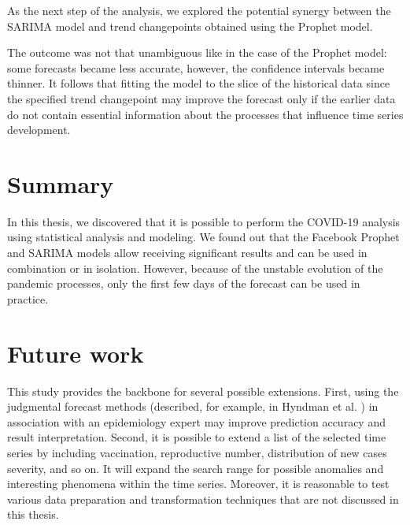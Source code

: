 As the next step of the analysis, we explored the potential synergy between the SARIMA model and trend changepoints obtained using the Prophet model. 

The outcome was not that unambiguous like in the case of the Prophet model: some forecasts became less accurate, however, the confidence intervals became thinner. It follows that fitting the model to the slice of the historical data since the specified trend changepoint may improve the forecast only if the earlier data do not contain essential information about the processes that influence time series development.

\section{Summary}

In this thesis, we discovered that it is possible to perform the COVID-19 analysis using statistical analysis and modeling. We found out that the Facebook Prophet and SARIMA models allow receiving significant results and can be used in combination or in isolation. However, because of the unstable evolution of the pandemic processes, only the first few days of the forecast can be used in practice.

\section{Future work}

This study provides the backbone for several possible extensions. First, using the judgmental forecast methods (described, for example, in Hyndman et al. \cite{Hyndman2018}) in association with an epidemiology expert may improve prediction accuracy and result interpretation. Second, it is possible to extend a list of the selected time series by including vaccination, reproductive number, distribution of new cases severity, and so on. It will expand the search range for possible anomalies and interesting phenomena within the time series. Moreover, it is reasonable to test various data preparation and transformation techniques that are not discussed in this thesis.  